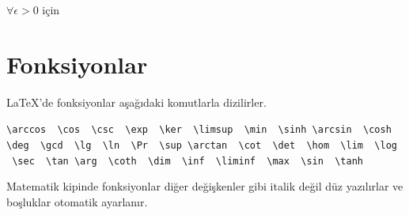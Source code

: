 \documentclass[
  10pt,
]{scrbook}
\newenvironment{Shaded}{\begin{snugshade}}{\end{snugshade}}
\newcommand{\NormalTok}[1]{#1}
\newcommand{\SpecialCharTok}[1]{\textcolor[rgb]{0.00,0.00,0.00}{#1}}
\newcommand{\SpecialStringTok}[1]{\textcolor[rgb]{0.31,0.60,0.02}{#1}}
\theoremstyle{definition}
\theoremstyle{definition}
\theoremstyle{definition}
\theoremstyle{definition}
\theoremstyle{remark}
\begin{document}
\begin{Shaded}
\end{Shaded}

\(\forall \epsilon>0\) için

\hypertarget{fonksiyonlar}{%
\section{Fonksiyonlar}\label{fonksiyonlar}}

LaTeX'de fonksiyonlar aşağıdaki komutlarla dizilirler.

\texttt{\textbackslash{}arccos\ \ \textbackslash{}cos\ \ \textbackslash{}csc\ \ \textbackslash{}exp\ \ \textbackslash{}ker\ \ \textbackslash{}limsup\ \ \textbackslash{}min\ \ \textbackslash{}sinh\ \textbackslash{}arcsin\ \ \textbackslash{}cosh\ \ \textbackslash{}deg\ \ \textbackslash{}gcd\ \ \textbackslash{}lg\ \ \textbackslash{}ln\ \ \textbackslash{}Pr\ \ \textbackslash{}sup\ \textbackslash{}arctan\ \ \textbackslash{}cot\ \ \textbackslash{}det\ \ \textbackslash{}hom\ \ \textbackslash{}lim\ \ \textbackslash{}log\ \ \textbackslash{}sec\ \ \textbackslash{}tan\ \textbackslash{}arg\ \ \textbackslash{}coth\ \ \textbackslash{}dim\ \ \textbackslash{}inf\ \ \textbackslash{}liminf\ \ \textbackslash{}max\ \ \textbackslash{}sin\ \ \textbackslash{}tanh}

Matematik kipinde fonksiyonlar diğer değişkenler gibi italik değil düz yazılırlar ve boşluklar otomatik ayarlanır.

\begin{Shaded}
\end{Shaded}
\end{document}
